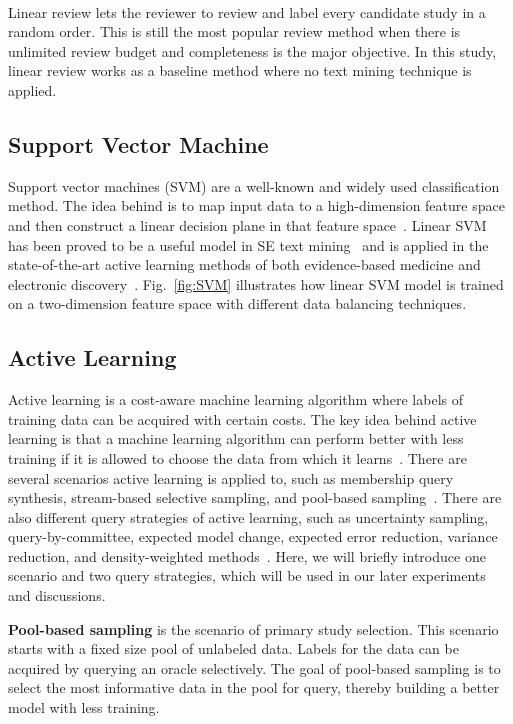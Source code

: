 \documentclass{svjour3}
\theoremstyle{break}
\newcommand{\respto}[1]{
\fcolorbox{black}{black!15}{
\label{response:#1}
\bf
  \scriptsize R-{#1}}~
}
\begin{document}
\respto{3f}
Linear review lets the reviewer to review and label every candidate study in a random order. This is still the most popular review method when there is unlimited review budget and completeness is the major objective. In this study, linear review works as a baseline method where no text mining technique is applied.

\subsection{Support Vector Machine}
\label{sect: Support Vector Machine}

Support vector machines (SVM) are a well-known and widely used classification method. The idea behind is to map input data to a high-dimension feature space and then construct a linear decision plane in that feature space~\cite{cortes1995support}. Linear SVM~\cite{joachims2006training} has been proved to be a useful model in SE text mining~\cite{krishna2016bigse} and is applied in the state-of-the-art active learning methods of both evidence-based medicine and electronic discovery~\cite{miwa2014reducing,wallace2010semi,cormack2014evaluation}. Fig.~\ref{fig:SVM} illustrates how linear SVM model is trained on a two-dimension feature space with different data balancing techniques.

\subsection{Active Learning}
\label{sect: Active learning}

Active learning is a cost-aware machine learning algorithm where labels of training data can be acquired with certain costs. The key idea behind active learning is that a machine learning algorithm can perform better with less
training if it is allowed to choose the data from which it learns~\cite{settles2012active}. There are several scenarios active learning is applied to, such as membership query synthesis, stream-based selective sampling, and pool-based sampling~\cite{settles2010active}. There are also different query strategies of active learning, such as uncertainty sampling, query-by-committee, expected model change, expected error reduction, variance reduction, and density-weighted methods~\cite{settles2010active}. Here, we will briefly introduce one scenario and two query strategies, which will be used in our later experiments and discussions.

\textbf{Pool-based sampling} is the scenario of primary study selection. This scenario starts with a fixed size pool of unlabeled data. Labels for the data can be acquired by querying an oracle selectively. The goal of pool-based sampling is to select the most informative data in the pool for query, thereby building a better model with less training.
\end{document}
